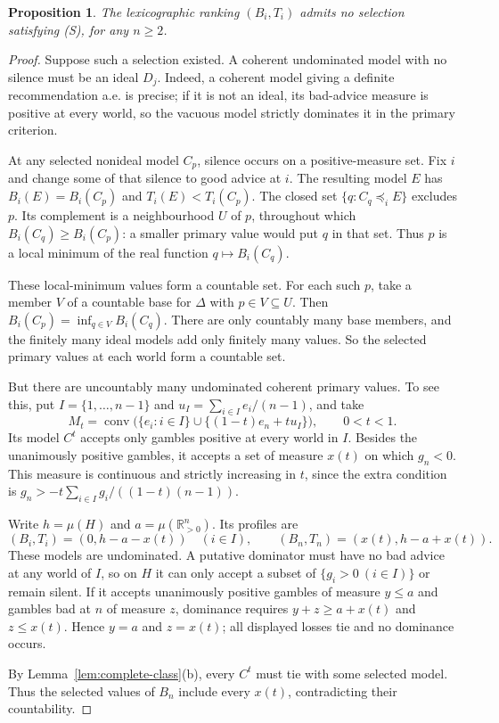 \documentclass[11pt]{article}
\newtheorem{proposition}[theorem]{Proposition}
\theoremstyle{remark}\newtheorem{remark}[theorem]{Remark}
\newcommand{\R}{\mathbb R}
\begin{document}
\begin{proposition}\label{prop:lex}
The lexicographic ranking $(B_i,T_i)$ admits no selection satisfying (S),
for any $n\ge2$.
\end{proposition}
\begin{proof}
Suppose such a selection existed. A coherent undominated model with no
silence must be an ideal $D_j$. Indeed, a coherent model giving a definite
recommendation a.e. is precise; if it is not an ideal, its bad-advice
measure is positive at every world, so the vacuous model strictly dominates
it in the primary criterion.

At any selected nonideal model $C_p$, silence occurs on a positive-measure
set. Fix $i$ and change some of that silence to good advice at $i$.
The resulting model $E$ has
$B_i(E)=B_i(C_p)$ and $T_i(E)<T_i(C_p)$.
The closed set $\{q:C_q\preceq_i E\}$ excludes $p$.
Its complement is a neighbourhood $U$ of $p$, throughout which
$B_i(C_q)\ge B_i(C_p)$: a smaller primary value would put $q$ in that set.
Thus $p$ is a local minimum of the real function $q\mapsto B_i(C_q)$.

These local-minimum values form a countable set. For each such $p$, take
a member $V$ of a countable base for $\Delta$ with $p\in V\subseteq U$.
Then $B_i(C_p)=\inf_{q\in V}B_i(C_q)$. There are only countably many base
members, and the finitely many ideal models add only finitely many values.
So the selected primary values at each world form a countable set.

But there are uncountably many undominated coherent primary values. To see
this, put $I=\{1,\ldots,n-1\}$ and $u_I=\sum_{i\in I}e_i/(n-1)$, and take
\[
 M_t=\operatorname{conv}\bigl(\{e_i:i\in I\}
             \cup\{(1-t)e_n+t u_I\}\bigr),\qquad0<t<1.
\]
Its model $C^t$ accepts only gambles positive at every world in $I$.
Besides the unanimously positive gambles, it accepts a set of measure
$x(t)$ on which $g_n<0$. This measure is continuous and strictly increasing
in $t$, since the extra condition is
$g_n>-t\sum_{i\in I}g_i/((1-t)(n-1))$.

Write $h=\mu(H)$ and $a=\mu(\R^n_{>0})$. Its profiles are
\[
 (B_i,T_i)=(0,h-a-x(t))\quad(i\in I),\qquad
 (B_n,T_n)=(x(t),h-a+x(t)).
\]
These models are undominated. A putative dominator must have no bad advice
at any world of $I$, so on $H$ it can only accept a subset of
$\{g_i>0\ (i\in I)\}$ or remain silent. If it accepts unanimously positive
gambles of measure $y\le a$ and gambles bad at $n$ of measure $z$, dominance
requires $y+z\ge a+x(t)$ and $z\le x(t)$. Hence $y=a$ and $z=x(t)$;
all displayed losses tie and no dominance occurs.

By Lemma~\ref{lem:complete-class}(b), every $C^t$ must tie with some selected
model. Thus the selected values of $B_n$ include every $x(t)$, contradicting
their countability.
\end{proof}
\end{document}
